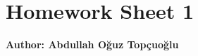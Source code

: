 \documentclass{article}
\begin{document}
\section*{\huge Homework Sheet 1}
\begin{flushright}
   \textbf{Author: Abdullah Oğuz Topçuoğlu}
\end{flushright}

%
% 
% 
% 
% 
% 
%
\end{document}
